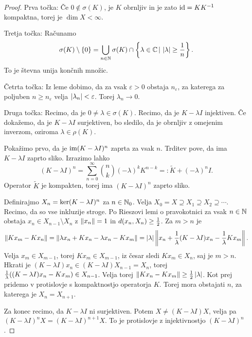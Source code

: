 \begin{proof}
  Prva točka:
  Če $0 \notin \sigma(K)$, je $K$ obrnljiv in je zato $\operatorname{id} = K K^{-1}$
  kompaktna, torej je $\dim X < \infty$.

  Tretja točka:
  Računamo
  \[
	\sigma(K) \setminus \{0\}
	= \bigcup_{n \in \mathbb{N}} \sigma(K) \cap \left\{ \lambda \in \mathbb{C} \,|\, \left| \lambda \right|
	\ge \frac{1}{n} \right\}.
  \]
  To je števna unija končnih množic.

  Četrta točka:
  Iz leme dobimo, da za vsak $\varepsilon > 0$ obstaja $n_\varepsilon$, za
  katerega za poljuben $n \ge n_\varepsilon$ velja $\left| \lambda_n \right| <
  \varepsilon$.
  Torej $\lambda_n \to 0$.

  Druga točka:
  Recimo, da je $0 \ne \lambda \in \sigma(K)$.
  Recimo, da je $K - \lambda I$ injektiven.
  Če dokažemo, da je $K - \lambda I$ surjektiven, bo sledilo, da je obrnljiv z
  omejenim inverzom, oziroma $\lambda \in \rho(K)$.

  Pokažimo prvo, da je $\operatorname{im} (K - \lambda I)^n$ zaprta za vsak $n$.
  Trditev pove, da ima $K - \lambda I$ zaprto sliko.
  Izrazimo lahko
  \[
	(K - \lambda I)^n
	= \sum_{n=0}^\infty \binom{n}{k} (-\lambda)^k K^{n-k}
	=: \tilde{K} + (-\lambda)^n I.
  \]
  Operator $\tilde{K}$ je kompakten, torej ima $(K - \lambda I)^n$ zaprto sliko.

  Definirajmo $X_n = \operatorname{ker} (K - \lambda I)^n$ za $n \in \mathbb{N}_0$.
  Velja $X_0 = X \supseteq X_1 \supseteq X_2 \supseteq \cdots$.
  Recimo, da so vse inkluzije stroge.
  Po Rieszovi lemi o pravokotnici za vsak $n \in \mathbb{N}$ obstaja $x_n \in X_{n-1}
  \setminus X_n$ z $\left\lVert x_n\right\rVert = 1$ in $d(x_n, X_n) \ge \frac{1}{2}$.
  Za $m > n$ je
  \[
	\left\lVert K x_m - K x_n\right\rVert
	= \left\lVert\lambda x_n + K x_n - \lambda x_n - K x_m\right\rVert
	= \left| \lambda \right| \left\lVert x_n + \frac{1}{\lambda} (K - \lambda I) x_n -
	  \frac{1}{\lambda} K x_m\right\rVert.
  \]
  Velja $x_m \in X_{m-1}$, torej $K x_m \in X_{m-1}$, iz česar sledi $K x_m \in
  X_n$, saj je $m > n$.
  Hkrati je $(K - \lambda I) x_n \in (K - \lambda I) X_{n-1} =X_n$, torej
  $\frac{1}{\lambda}((K - \lambda I) x_n - K x_m) \in X_{n-1}$.
  Velja torej $\left\lVert K x_n - K x_m\right\rVert \ge \frac{1}{2} \left| \lambda \right|$.
  Kot prej pridemo v protislovje s kompaktnostjo operatorja $K$.
  Torej mora obstajati $n$, za katerega je $X_n = X_{n+1}$.

  Za konec recimo, da $K - \lambda I$ ni surjektiven.
  Potem $X \ne (K - \lambda I) X$, velja pa $(K - \lambda I)^n X = (K - \lambda
  I)^{n+1} X$.
  To je protislovje z injektivnostjo $(K - \lambda I)^n$.
\end{proof}

